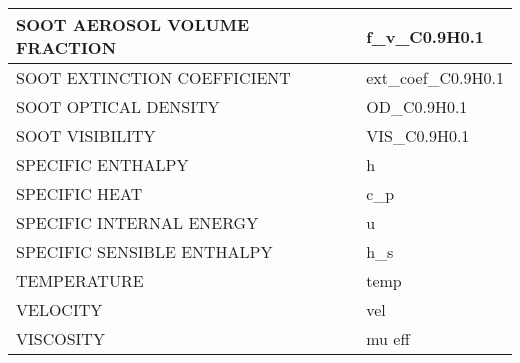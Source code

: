 \begin{table}[bph]
\begin{center}
\begin{tabular}{|l|l|}
 SOOT AEROSOL VOLUME FRACTION  &   f\_v\_C0.9H0.1 \\ \hline
 SOOT EXTINCTION COEFFICIENT  &   ext\_coef\_C0.9H0.1 \\ \hline
 SOOT OPTICAL DENSITY  &   OD\_C0.9H0.1 \\ \hline
 SOOT VISIBILITY  &   VIS\_C0.9H0.1 \\ \hline
 SPECIFIC ENTHALPY  &   h \\ \hline
 SPECIFIC HEAT  &   c\_p \\ \hline
 SPECIFIC INTERNAL ENERGY  &   u \\ \hline
 SPECIFIC SENSIBLE ENTHALPY  &   h\_s \\ \hline
 TEMPERATURE  &   temp \\ \hline
 VELOCITY  &   vel \\ \hline
 VISCOSITY  &   mu eff \\ \hline
\end{tabular}
\label{tabSLCF}
\end{center}
\end{table}
